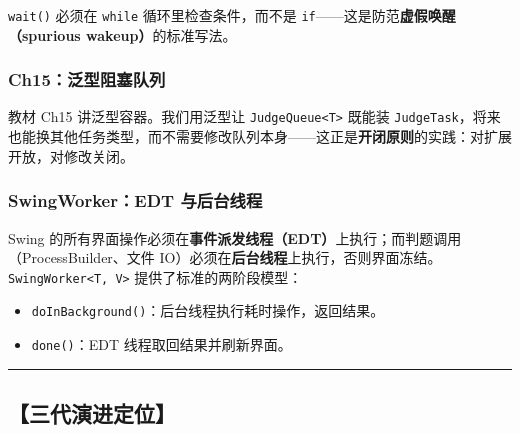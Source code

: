 \documentclass[
  11pt,
]{ctexart}
\providecommand{\tightlist}{%
  \setlength{\itemsep}{0pt}\setlength{\parskip}{0pt}}
\begin{document}
\texttt{wait()} 必须在 \texttt{while} 循环里检查条件，而不是
\texttt{if}------这是防范\textbf{虚假唤醒（spurious
wakeup）}的标准写法。

\hypertarget{ch15ux6cdbux578bux963bux585eux961fux5217}{%
\subsubsection{Ch15：泛型阻塞队列}\label{ch15ux6cdbux578bux963bux585eux961fux5217}}

教材 Ch15 讲泛型容器。我们用泛型让
\texttt{JudgeQueue\textless{}T\textgreater{}} 既能装
\texttt{JudgeTask}，将来也能换其他任务类型，而不需要修改队列本身------这正是\textbf{开闭原则}的实践：对扩展开放，对修改关闭。

\hypertarget{swingworkeredt-ux4e0eux540eux53f0ux7ebfux7a0b}{%
\subsubsection{SwingWorker：EDT
与后台线程}\label{swingworkeredt-ux4e0eux540eux53f0ux7ebfux7a0b}}

Swing
的所有界面操作必须在\textbf{事件派发线程（EDT）}上执行；而判题调用（ProcessBuilder、文件
IO）必须在\textbf{后台线程}上执行，否则界面冻结。\texttt{SwingWorker\textless{}T,\ V\textgreater{}}
提供了标准的两阶段模型：

\begin{itemize}
\tightlist
\item
  \texttt{doInBackground()}：后台线程执行耗时操作，返回结果。
\item
  \texttt{done()}：EDT 线程取回结果并刷新界面。
\end{itemize}

\begin{center}\rule{0.5\linewidth}{0.5pt}\end{center}

\hypertarget{ux4e09ux4ee3ux6f14ux8fdbux5b9aux4f4d-4}{%
\subsection{【三代演进定位】}\label{ux4e09ux4ee3ux6f14ux8fdbux5b9aux4f4d-4}}
\end{document}
